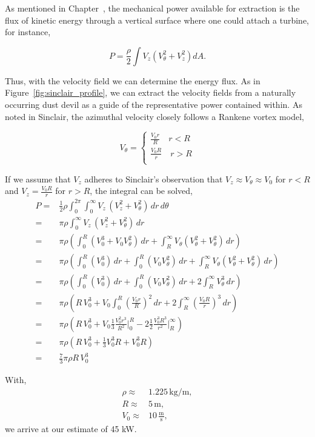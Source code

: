 \label{scaling}

As mentioned in Chapter~\label{sec:physics}, the mechanical power
available for extraction is the flux of kinetic energy through a
vertical surface where one could attach a turbine, for instance, 

\begin{equation}
 P = \frac{\rho }{2} \int V_z (V_{\theta}^2 + V_z^2 ) dA. 
\end{equation}

Thus, with the velocity field we can determine the energy
flux. As in Figure~\ref{fig:sinclair_profile}, we can extract the
velocity fields from a naturally occurring dust devil as a guide of the 
representative power contained within. As noted in Sinclair, the
azimuthal velocity closely follows a Rankene vortex model, 

\begin{equation}
 V_{\theta} = 
  \begin{cases}
   \frac{V_0 r}{R} \quad r < R \\
   \frac{V_0 R}{r} \quad r > R \\
  \end{cases}
\end{equation}

If we assume that $V_z$ adheres to Sinclair's observation that $V_z \approx
V_{\theta} \approx V_0$ for $r < R$ and $V_z=\frac{V_0 R}{r}$ for $r > R$,
the integral can be solved, 
\begin{eqnarray}
 P =& \frac{1}{2} \rho \int_0^{2\pi}\int_0^{\infty} V_z \, (V^2_z +
  V_{\theta}^2)\, dr \, d\theta \\ 
 =& \pi \rho \int_0^{\infty} V_z \, (V^2_z + V_{\theta}^2)\, dr \\
 =& \pi \rho \left( \int_0^R (V_0^3 + V_0 V_{\theta}^2)\,dr +
	      \int_R^{\infty} V_{\theta} (V_{\theta}^2 + V_{\theta}^2)\,dr 
	     \right) \\
 =& \pi \rho \left( \int_0^R (V_0^3)\, dr + \int_0^R (V_0 V_{\theta}^2)\,dr +
	      \int_R^{\infty} V_{\theta} (V_{\theta}^2 + V_{\theta}^2) \,dr 
		     \right) \\
 =& \pi \rho \left( \int_0^R (V_0^3)\, dr + \int_0^R (V_0 V_{\theta}^2)\,dr +
	      2 \int_R^{\infty} V_{\theta}^3 \,dr 
		     \right) \\
 =& \pi \rho \left( R\, V_0^3 + V_0 \int_0^R (\frac{V_0 r}{R})^2\,dr +
	      2 \int_R^{\infty} (\frac{V_0 R}{r})^3 \,dr 
		     \right) \\
 =& \pi \rho \left( R\, V_0^3 + V_0 \frac{1}{3} \frac{V_0^2 r^3}{R^2}\rvert_0^R -
	      2 \frac{1}{2} \frac{V_0^3 R^3}{r^2}\rvert_R^{\infty}
		      \right) \\
 =& \pi \rho \left( R\, V_0^3 + \frac{1}{3} V_0^3 R + V_0^3 R \right)\\
 =& \frac{7}{3}\pi \rho R\, V_0^3
\end{eqnarray}

%
%

With, 
\begin{eqnarray}
 \rho \approx& 1.225 \,\text{kg}/\text{m}, \\
 R \approx& 5 \,\text{m}, \\
 V_0 \approx& 10 \,\frac{\text{m}}{\text{s}},
\end{eqnarray}
we arrive at our estimate of 45 kW.

%
%